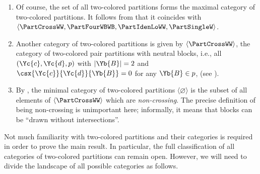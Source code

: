 \documentclass[pdftex]{sigma}
\numberwithin{equation}{section}
\begin{document}
\begin{Example}\quad
            \newcommand{\inlen}{k}
          \newcommand{\outlen}{\ell}
            \newcommand{\incol}{\Yc{c}}
            \newcommand{\outcol}{\Yc{d}}
          \newcommand{\thepartition}{p}
          \newcommand{\block}{\Yb{B}}
          \newcommand{\inind}{a}
          \newcommand{\outind}{b}
          \begin{enumerate}
            \item Of course, the set of all two-co\-lo\-red partitions forms the maximal category of two-co\-lo\-red partitions. It follows from \cite[Theorem~8.3]{TarragoWeber2018} that it coincides with $\langle \PartCrossWW,\PartFourWBWB,\PartIdenLoWW,\PartSingleW\rangle$.
  \item Another category of two-co\-lo\-red partitions is given by  $\langle \PartCrossWW\rangle$, the category of two-co\-lo\-red pair partitions with neutral blocks,  i.e., all  $(\incol,\outcol,\thepartition)$ with $|\block|=2$ and $\csx{\incol}{\outcol}{\block}=0$    for any $\block\in \thepartition$, (see \cite[Proposition~5.3]{MangWeber2020}).
  \item By \cite[Theorem~7.2]{TarragoWeber2018}, the minimal category of two-co\-lo\-red partitions $\langle \varnothing\rangle$ is the subset of all elements of  $\langle \PartCrossWW\rangle$ which are \emph{non-crossing}. The precise definition of being non-crossing is unimportant here; informally, it means that blocks can be  ``drawn without intersections''.
  \end{enumerate}
\end{Example}
Not much familiarity with two-co\-lo\-red partitions and their categories is required in order to prove the main result. In particular, the full classification of all categories of two-co\-lo\-red partitions can remain open. However, we will need to divide the landscape of all possible categories as follows.
\end{document}
